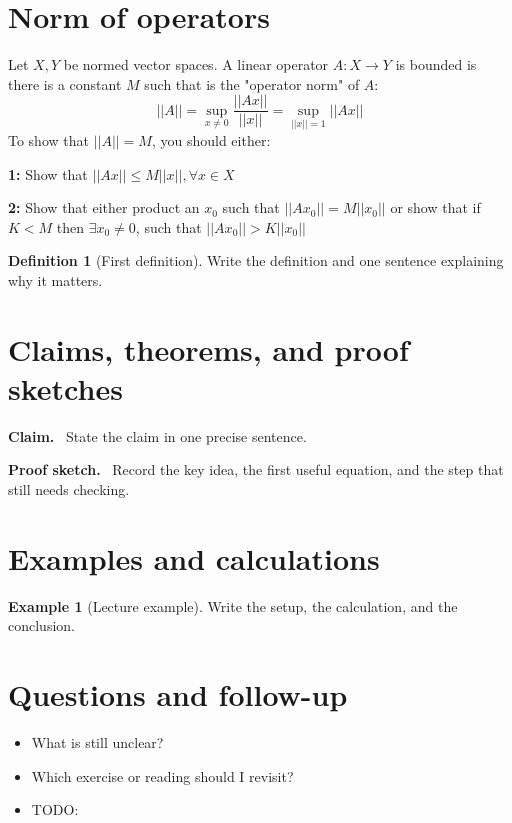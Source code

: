 \documentclass[11pt]{article}
\newcommand{\1}{\mathbf{1}}
\theoremstyle{notestyle}
\theoremstyle{definition}
\newtheorem{definition}[theorem]{Definition}
\newtheorem{example}[theorem]{Example}
\newenvironment{claim}{\par\noindent\textbf{Claim.}\ }{\par}
\newenvironment{proofsketch}{\par\noindent\textbf{Proof sketch.}\ }{\par}
\begin{document}
\section{Norm of operators}
Let $X, Y$ be normed vector spaces.
A linear operator $A : X \rightarrow Y$ is bounded is there is a constant $M$  such that
is the "operator norm" of $A$:
$$||A|| = \sup_{x\ne 0} \frac{||Ax||}{||x||} = \sup_{||x||=1}||Ax||$$
To show that $||A|| = M$, you should either:
\par \textbf{1: } Show that $||Ax|| \le M ||x||, \forall x \in X$
\par \textbf{2: } Show that either product an $x_0$ such that $||Ax_0|| = M||x_0||$ or
show that if $K < M$ then $\exists x_0 \ne 0$, such that $||Ax_0|| > K||x_0||$
%
\begin{definition}[First definition]
Write the definition and one sentence explaining why it matters.
\end{definition}

\section{Claims, theorems, and proof sketches}
\begin{claim}
State the claim in one precise sentence.
\end{claim}

\begin{proofsketch}
Record the key idea, the first useful equation, and the step that still needs checking.
\end{proofsketch}

\section{Examples and calculations}
\begin{example}[Lecture example]
Write the setup, the calculation, and the conclusion.
\end{example}

\section{Questions and follow-up}
\begin{itemize}
  \item What is still unclear?
  \item Which exercise or reading should I revisit?
  \item TODO:
\end{itemize}
\end{document}
